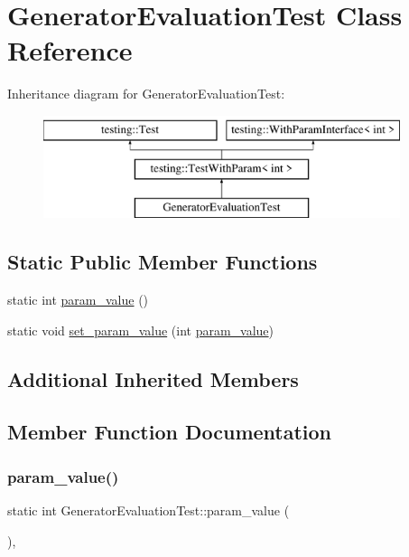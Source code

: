 \hypertarget{classGeneratorEvaluationTest}{}\section{Generator\+Evaluation\+Test Class Reference}
\label{classGeneratorEvaluationTest}
Inheritance diagram for Generator\+Evaluation\+Test\+:\begin{figure}[H]
\begin{center}
\leavevmode
\includegraphics[height=3.000000cm]{classGeneratorEvaluationTest}
\end{center}
\end{figure}
\subsection*{Static Public Member Functions}
\begin{DoxyCompactItemize}
\item 
static int \mbox{\hyperlink{classGeneratorEvaluationTest_ac819769e32b738677401424deb3c8cbe}{param\+\_\+value}} ()
\item 
static void \mbox{\hyperlink{classGeneratorEvaluationTest_ae4f5fb96577dd680d9fa1fd6c3c4af46}{set\+\_\+param\+\_\+value}} (int \mbox{\hyperlink{classGeneratorEvaluationTest_ac819769e32b738677401424deb3c8cbe}{param\+\_\+value}})
\end{DoxyCompactItemize}
\subsection*{Additional Inherited Members}


\subsection{Member Function Documentation}
\mbox{\label{classGeneratorEvaluationTest_ac819769e32b738677401424deb3c8cbe}} 
\subsubsection{\texorpdfstring{param\_value()}{param\_value()}}
{\footnotesize\ttfamily static int Generator\+Evaluation\+Test\+::param\+\_\+value (\begin{DoxyParamCaption}{ }\end{DoxyParamCaption})\hspace{0.3cm}{\ttfamily [inline]}, {\ttfamily [static]}}

